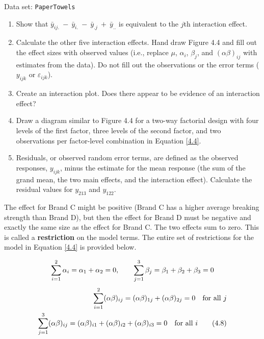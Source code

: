 \documentclass[
]{report}
\begin{document}
Data set: \texttt{PaperTowels}

\begin{enumerate}
\def\labelenumi{\arabic{enumi}.}
\setcounter{enumi}{25}
\item
  Show that \(\scriptstyle \bar{y}_{ij.} \ -\  \bar{y}_{i.} \ -\  \bar{y}_{.j} \ +\  \bar{y}_{..}\) is equivalent to the \(j\)th interaction effect.
\item
  Calculate the other five interaction effects. Hand draw Figure 4.4 and fill out the effect sizes with observed values (i.e., replace \(\scriptstyle \mu\), \(\scriptstyle \alpha_i\), \(\scriptstyle \beta_j\), and \(\scriptstyle (\alpha\beta)_{ij}\) with estimates from the data). Do not fill out the observations or the error terms (\(\scriptstyle y_{ijk}\) or \(\scriptstyle \varepsilon_{ijk}\)).
\item
  Create an interaction plot. Does there appear to be evidence of an interaction effect?
\item
  Draw a diagram similar to Figure 4.4 for a two-way factorial design with four levels of the first factor, three levels of the second factor, and two observations per factor-level combination in Equation \ref{4.4}.
\item
  Residuals, or observed random error terms, are defined as the observed responses, \(\scriptstyle y_{ijk}\), minus the estimate for the mean response (the sum of the grand mean, the two main effects, and the interaction effect). Calculate the residual values for \(\scriptstyle y_{213}\) and \(\scriptstyle y_{122}\).
\end{enumerate}

The effect for Brand C might be positive (Brand C has a higher average breaking strength than Brand D), but then the effect for Brand D must be negative and exactly the same size as the effect for Brand C. The two effects sum to zero. This is called a \textbf{restriction} on the model terms. The entire set of restrictions for the model in Equation \ref{4.4} is provided below.

\begin{align}
\sum_{i=1}^{2} \alpha_i = \alpha_1 + \alpha_2 = 0, \qquad \sum_{j=1}^{3} \beta_j = \beta_1 + \beta_2 + \beta_3 = 0 \notag
\end{align}
\begin{align}
\sum_{i=1}^{2} (\alpha\beta)_{ij} = (\alpha\beta)_{1j} + (\alpha\beta)_{2j} = 0 \quad \text{for all } j \notag \\
\sum_{j=1}^{3} (\alpha\beta)_{ij} = (\alpha\beta)_{i1} + (\alpha\beta)_{i2} + (\alpha\beta)_{i3} = 0 \quad \text{for all } i \tag{4.8} \label{4.8}
\end{align}
\end{document}
